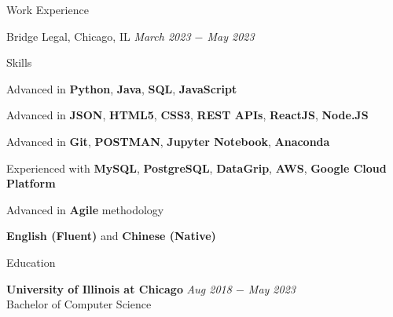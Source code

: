 \documentclass{resume}
\begin{document}
\begin{rSection}{Work Experience}
\begin{rSubsection}{Bridge Legal, Chicago, IL} {\textit{March 2023 $-$ May 2023}}
\end{rSubsection}

\end{rSection}

\begin{rSection}{Skills}

\begin{rSubsection}{}{}
{} %

    \item Advanced in \textbf{Python}, \textbf{Java}, \textbf{SQL}, \textbf{JavaScript}
    \item Advanced in \textbf{JSON}, \textbf{HTML5}, \textbf{CSS3}, \textbf{REST APIs}, \textbf{ReactJS}, \textbf{Node.JS}
    \item Advanced in \textbf{Git}, \textbf{POSTMAN}, \textbf{Jupyter Notebook}, \textbf{Anaconda}
    \item Experienced with \textbf{MySQL}, \textbf{PostgreSQL}, \textbf{DataGrip}, \textbf{AWS}, \textbf{Google Cloud Platform}
    \item Advanced in \textbf{Agile} methodology
    \item \textbf{English (Fluent)} and \textbf{Chinese (Native)}

\end{rSubsection}

\end{rSection}

\begin{rSection}{Education}

    \item {\bf University of Illinois at Chicago} \hfill {\em Aug 2018 $-$ May 2023}
    \\ Bachelor of Computer Science

\end{rSection}
\end{document}
